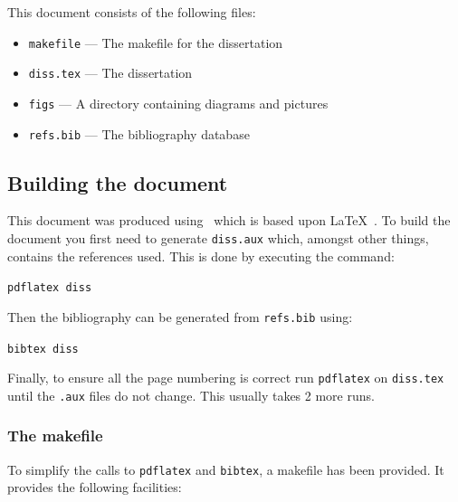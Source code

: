 \documentclass[12pt,a4paper]{article}
\begin{document}
This document consists of the following files:

\begin{itemize}
    \item \texttt{makefile} --- The makefile for the dissertation
    \item \texttt{diss.tex} --- The dissertation
    \item \texttt{figs} --- A directory containing diagrams and pictures
    \item \texttt{refs.bib} --- The bibliography database
\end{itemize}

\subsection{Building the document}

This document was produced using \LaTeXe~which is based upon \LaTeX~\citep{Lamport86}. 
To build the document you first need to generate \texttt{diss.aux} which, amongst
other things, contains the references used. This is done by executing the command:

\texttt{pdflatex diss}

\noindent
Then the bibliography can be generated from \texttt{refs.bib} using:

\texttt{bibtex diss}

\noindent
Finally, to ensure all the page numbering is correct run \texttt{pdflatex} on
\texttt{diss.tex} until the \texttt{.aux} files do not change. This usually
takes 2 more runs.

\subsubsection{The makefile}

To simplify the calls to \texttt{pdflatex} and \texttt{bibtex}, a makefile has
been provided. It provides the following facilities:
\end{document}
